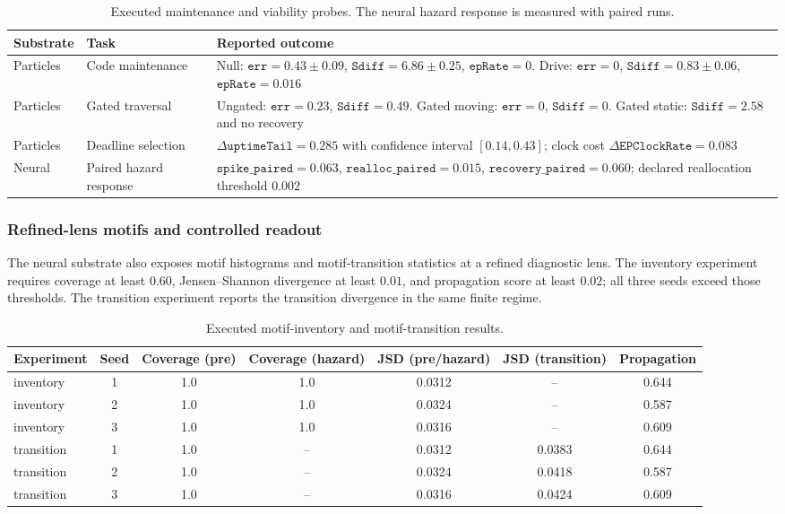 \begin{table}[htbp]
\centering
\scriptsize
\begin{tabularx}{\textwidth}{@{}llX@{}}
\toprule
Substrate & Task & Reported outcome \\
\midrule
Particles & Code maintenance &
Null: $\texttt{err}=0.43\pm0.09$,
$\texttt{Sdiff}=6.86\pm0.25$, $\texttt{epRate}=0$.
Drive: $\texttt{err}=0$,
$\texttt{Sdiff}=0.83\pm0.06$, $\texttt{epRate}=0.016$ \\
Particles & Gated traversal &
Ungated: $\texttt{err}=0.23$, $\texttt{Sdiff}=0.49$.
Gated moving: $\texttt{err}=0$, $\texttt{Sdiff}=0$.
Gated static: $\texttt{Sdiff}=2.58$ and no recovery \\
Particles & Deadline selection &
$\Delta\texttt{uptimeTail}=0.285$ with confidence interval
$[0.14,0.43]$; clock cost
$\Delta\texttt{EPClockRate}=0.083$ \\
Neural & Paired hazard response &
$\texttt{spike\_paired}=0.063$,
$\texttt{realloc\_paired}=0.015$,
$\texttt{recovery\_paired}=0.060$; declared reallocation threshold
$0.002$ \\
\bottomrule
\end{tabularx}
\caption{Executed maintenance and viability probes.  The neural hazard
response is measured with paired runs.}
\label{tab:life-maintenance}
\end{table}

\subsubsection{Refined-lens motifs and controlled readout}

The neural substrate also exposes motif histograms and motif-transition
statistics at a refined diagnostic lens.  The inventory experiment requires coverage at
least $0.60$, Jensen--Shannon divergence at least $0.01$, and propagation
score at least $0.02$; all three seeds exceed those thresholds.  The transition experiment reports
the transition divergence in the same finite regime.

\begin{table}[htbp]
\centering
\scriptsize
\begin{tabular}{@{}lcccccc@{}}
\toprule
Experiment & Seed & Coverage (pre) & Coverage (hazard) & JSD (pre/hazard) &
JSD (transition) & Propagation \\
\midrule
inventory & 1 & 1.0 & 1.0 & 0.0312 & -- & 0.644 \\
inventory & 2 & 1.0 & 1.0 & 0.0324 & -- & 0.587 \\
inventory & 3 & 1.0 & 1.0 & 0.0316 & -- & 0.609 \\
\addlinespace
transition & 1 & 1.0 & -- & 0.0312 & 0.0383 & 0.644 \\
transition & 2 & 1.0 & -- & 0.0324 & 0.0418 & 0.587 \\
transition & 3 & 1.0 & -- & 0.0316 & 0.0424 & 0.609 \\
\bottomrule
\end{tabular}
\caption{Executed motif-inventory and motif-transition results.}
\label{tab:life-motifs}
\end{table}

